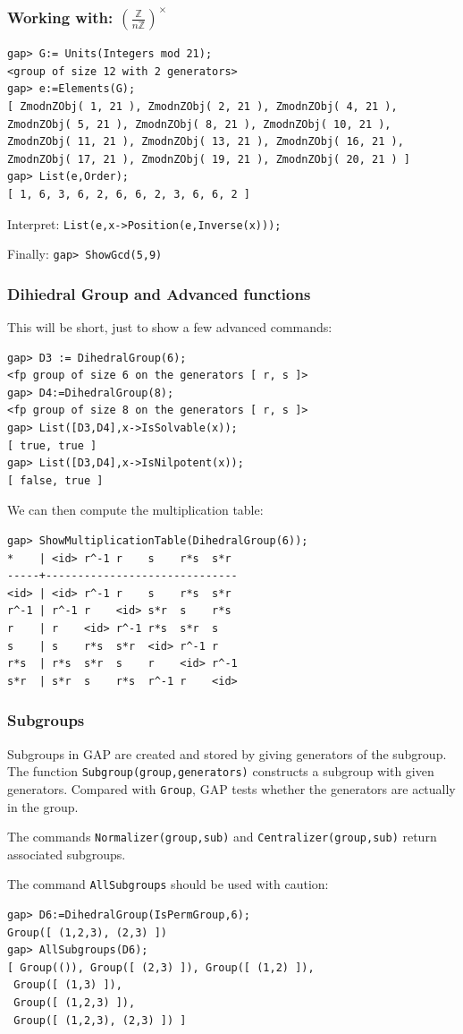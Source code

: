 \documentclass{beamer}
\theoremstyle{definition}
\theoremstyle{remark}
\begin{document}
\begin{frame}[fragile]
\frametitle{Working with: $ \left( \frac{\mathbb{Z}}{n\mathbb{Z}} \right)^{\times} $}
\begin{verbatim}
gap> G:= Units(Integers mod 21);
<group of size 12 with 2 generators>
gap> e:=Elements(G);
[ ZmodnZObj( 1, 21 ), ZmodnZObj( 2, 21 ), ZmodnZObj( 4, 21 ),
ZmodnZObj( 5, 21 ), ZmodnZObj( 8, 21 ), ZmodnZObj( 10, 21 ),
ZmodnZObj( 11, 21 ), ZmodnZObj( 13, 21 ), ZmodnZObj( 16, 21 ),
ZmodnZObj( 17, 21 ), ZmodnZObj( 19, 21 ), ZmodnZObj( 20, 21 ) ]
gap> List(e,Order);
[ 1, 6, 3, 6, 2, 6, 6, 2, 3, 6, 6, 2 ]
\end{verbatim}
\pause
\begin{alertblock}{Interpret:}
	\texttt{List(e,x->Position(e,Inverse(x)));}
\end{alertblock}

Finally: \texttt{gap> ShowGcd(5,9)}

\end{frame}

\begin{frame}
\frametitle{Dihiedral Group and Advanced functions}
This will be short, just to show a few advanced commands:
\begin{verbatim}
gap> D3 := DihedralGroup(6);
<fp group of size 6 on the generators [ r, s ]>
gap> D4:=DihedralGroup(8);
<fp group of size 8 on the generators [ r, s ]>
gap> List([D3,D4],x->IsSolvable(x));
[ true, true ]
gap> List([D3,D4],x->IsNilpotent(x));
[ false, true ]
\end{verbatim}
We can then compute the multiplication table:
\begin{verbatim}
gap> ShowMultiplicationTable(DihedralGroup(6));
*    | <id> r^-1 r    s    r*s  s*r
-----+------------------------------
<id> | <id> r^-1 r    s    r*s  s*r
r^-1 | r^-1 r    <id> s*r  s    r*s
r    | r    <id> r^-1 r*s  s*r  s
s    | s    r*s  s*r  <id> r^-1 r
r*s  | r*s  s*r  s    r    <id> r^-1
s*r  | s*r  s    r*s  r^-1 r    <id>
\end{verbatim}
\end{frame}

\begin{frame}[fragile]
	\frametitle{Subgroups}
	Subgroups in GAP are created and stored by giving generators of the subgroup. The function \texttt{Subgroup(group,generators)} constructs a subgroup with given generators. Compared with \texttt{Group}, GAP tests whether the generators are actually in the group.
	
	The commands \texttt{Normalizer(group,sub)} and \texttt{Centralizer(group,sub)} return associated subgroups.
	
	The command \texttt{AllSubgroups} should be used with caution:
\begin{verbatim}
gap> D6:=DihedralGroup(IsPermGroup,6);
Group([ (1,2,3), (2,3) ])
gap> AllSubgroups(D6);
[ Group(()), Group([ (2,3) ]), Group([ (1,2) ]),
 Group([ (1,3) ]), 
 Group([ (1,2,3) ]), 
 Group([ (1,2,3), (2,3) ]) ]
\end{verbatim}
\end{frame}
\end{document}
